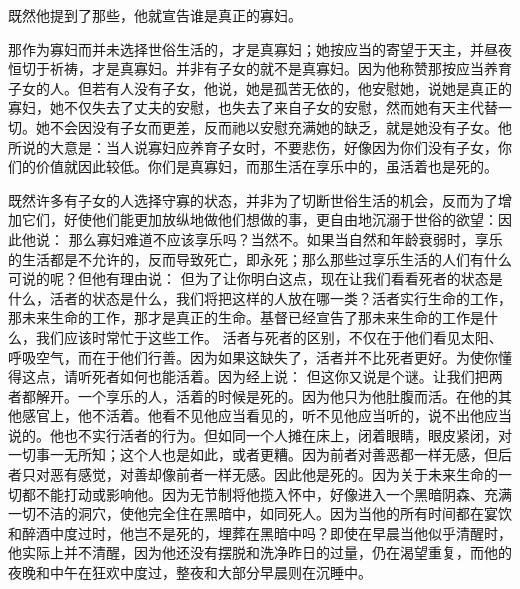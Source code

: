 既然他提到了那些，他就宣告谁是真正的寡妇。\par

 \par

那作为寡妇而并未选择世俗生活的，才是真寡妇；她按应当的寄望于天主，并昼夜恒切于祈祷，才是真寡妇。并非有子女的就不是真寡妇。因为他称赞那按应当养育子女的人。但若有人没有子女，他说，她是孤苦无依的，他安慰她，说她是真正的寡妇，她不仅失去了丈夫的安慰，也失去了来自子女的安慰，然而她有天主代替一切。她不会因没有子女而更差，反而祂以安慰充满她的缺乏，就是她没有子女。他所说的大意是：当人说寡妇应养育子女时，不要悲伤，好像因为你们没有子女，你们的价值就因此较低。你们是真寡妇，而那生活在享乐中的，虽活着也是死的。\par

既然许多有子女的人选择守寡的状态，并非为了切断世俗生活的机会，反而为了增加它们，好使他们能更加放纵地做他们想做的事，更自由地沉溺于世俗的欲望：因此他说： 那么寡妇难道不应该享乐吗？当然不。如果当自然和年龄衰弱时，享乐的生活都是不允许的，反而导致死亡，即永死；那么那些过享乐生活的人们有什么可说的呢？但他有理由说： 但为了让你明白这点，现在让我们看看死者的状态是什么，活者的状态是什么，我们将把这样的人放在哪一类？活者实行生命的工作，那未来生命的工作，那才是真正的生命。基督已经宣告了那未来生命的工作是什么，我们应该时常忙于这些工作。  活者与死者的区别，不仅在于他们看见太阳、呼吸空气，而在于他们行善。因为如果这缺失了，活者并不比死者更好。为使你懂得这点，请听死者如何也能活着。因为经上说：  但这你又说是个谜。让我们把两者都解开。一个享乐的人，活着的时候是死的。因为他只为他肚腹而活。在他的其他感官上，他不活着。他看不见他应当看见的，听不见他应当听的，说不出他应当说的。他也不实行活者的行为。但如同一个人摊在床上，闭着眼睛，眼皮紧闭，对一切事一无所知；这个人也是如此，或者更糟。因为前者对善恶都一样无感，但后者只对恶有感觉，对善却像前者一样无感。因此他是死的。因为关于未来生命的一切都不能打动或影响他。因为无节制将他揽入怀中，好像进入一个黑暗阴森、充满一切不洁的洞穴，使他完全住在黑暗中，如同死人。因为当他的所有时间都在宴饮和醉酒中度过时，他岂不是死的，埋葬在黑暗中吗？即使在早晨当他似乎清醒时，他实际上并不清醒，因为他还没有摆脱和洗净昨日的过量，仍在渴望重复，而他的夜晚和中午在狂欢中度过，整夜和大部分早晨则在沉睡中。\par

